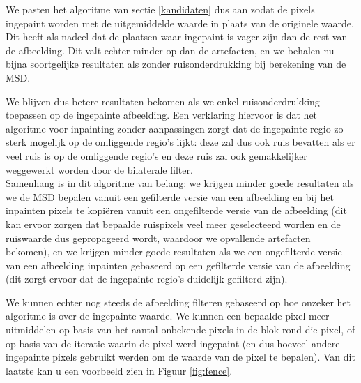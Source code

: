 \documentclass[titlepage]{article}
\begin{document}
We pasten het algoritme van sectie \ref{kandidaten} dus aan zodat de pixels ingepaint worden met de uitgemiddelde waarde in plaats van de originele waarde. Dit heeft als nadeel dat de plaatsen waar ingepaint is vager zijn dan de rest van de afbeelding. Dit valt echter minder op dan de artefacten, en we behalen nu bijna soortgelijke resultaten als zonder ruisonderdrukking bij berekening van de MSD.

We blijven dus betere resultaten bekomen als we enkel ruisonderdrukking toepassen op de ingepainte afbeelding. Een verklaring hiervoor is dat het algoritme voor inpainting zonder aanpassingen zorgt dat de ingepainte regio zo sterk mogelijk op de omliggende regio's lijkt: deze zal dus ook ruis bevatten als er veel ruis is op de omliggende regio's en deze ruis zal ook gemakkelijker weggewerkt worden door de bilaterale filter. \\
Samenhang is in dit algoritme van belang: we krijgen minder goede resultaten als we de MSD bepalen vanuit een gefilterde versie van een afbeelding en bij het inpainten pixels te kopi\"eren vanuit een ongefilterde versie van de afbeelding (dit kan ervoor zorgen dat bepaalde ruispixels veel meer geselecteerd worden en de ruiswaarde dus gepropageerd wordt, waardoor we opvallende artefacten bekomen), en we krijgen minder goede resultaten als we een ongefilterde versie van een afbeelding inpainten gebaseerd op een gefilterde versie van de afbeelding (dit zorgt ervoor dat de ingepainte regio's duidelijk gefilterd zijn).

We kunnen echter nog steeds de afbeelding filteren gebaseerd op hoe onzeker het algoritme is over de ingepainte waarde. We kunnen een bepaalde pixel meer uitmiddelen op basis van het aantal onbekende pixels in de blok rond die pixel, of op basis van de iteratie waarin de pixel werd ingepaint (en dus hoeveel andere ingepainte pixels gebruikt werden om de waarde van de pixel te bepalen). Van dit laatste kan u een voorbeeld zien in Figuur \ref{fig:fence}.
\end{document}
